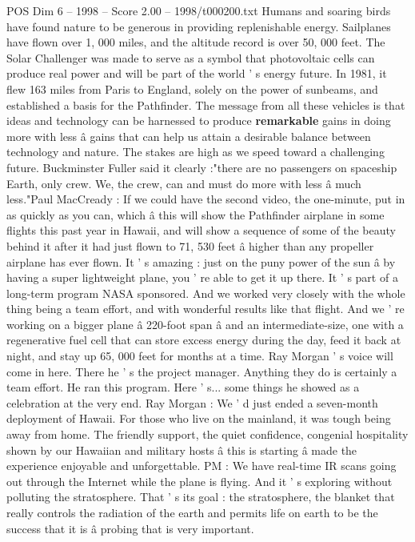 \begin{textsample}{POS Dim 6 – 1998 – Score 2.00 – 1998/t000200.txt}
Humans and soaring birds have found nature to be generous in providing replenishable energy.
Sailplanes have flown over 1, 000 miles, and the altitude record is over 50, 000 feet.
The Solar Challenger was made to serve as a symbol that photovoltaic cells can produce real power and will be part of the world ' s energy future.
In 1981, it flew 163 miles from Paris to England, solely on the power of sunbeams, and established a basis for the Pathfinder.
The message from all these vehicles is that ideas and technology can be harnessed to produce \textbf{remarkable} gains in doing more with less â gains that can help us attain a desirable balance between technology and nature.
The stakes are high as we speed toward a challenging future.
Buckminster Fuller said it clearly :"there are no passengers on spaceship Earth, only crew.
We, the crew, can and must do more with less â much less."Paul MacCready : If we could have the second video, the one-minute, put in as quickly as you can, which â this will show the Pathfinder airplane in some flights this past year in Hawaii, and will show a sequence of some of the beauty behind it after it had just flown to 71, 530 feet â higher than any propeller airplane has ever flown.
It ' s amazing : just on the puny power of the sun â by having a super lightweight plane, you ' re able to get it up there.
It ' s part of a long-term program NASA sponsored.
And we worked very closely with the whole thing being a team effort, and with wonderful results like that flight.
And we ' re working on a bigger plane â 220-foot span â and an intermediate-size, one with a regenerative fuel cell that can store excess energy during the day, feed it back at night, and stay up 65, 000 feet for months at a time.
Ray Morgan ' s voice will come in here.
There he ' s the project manager.
Anything they do is certainly a team effort.
He ran this program.
Here ' s... some things he showed as a celebration at the very end.
Ray Morgan : We ' d just ended a seven-month deployment of Hawaii.
For those who live on the mainland, it was tough being away from home.
The friendly support, the quiet confidence, congenial hospitality shown by our Hawaiian and military hosts â this is starting â made the experience enjoyable and unforgettable.
PM : We have real-time IR scans going out through the Internet while the plane is flying.
And it ' s exploring without polluting the stratosphere.
That ' s its goal : the stratosphere, the blanket that really controls the radiation of the earth and permits life on earth to be the success that it is â probing that is very important.

\end{textsample}

